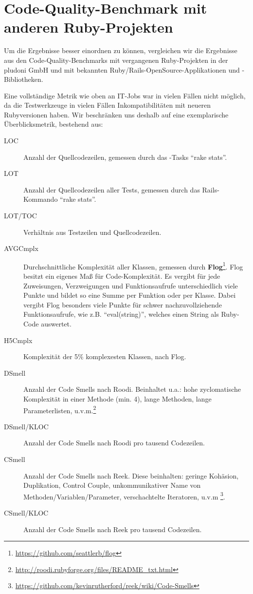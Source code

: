 
\section{Code-Quality-Benchmark mit anderen Ruby-Projekten}

Um die Ergebnisse besser einordnen zu können, vergleichen wir die Ergebnisse aus den Code-Quality-Benchmarks mit vergangenen Ruby-Projekten in der pludoni GmbH und mit bekannten Ruby/Rails-OpenSource-Applikationen und -Bibliotheken.

Eine vollständige Metrik wie oben an IT-Jobs war in vielen Fällen nicht möglich, da die Testwerkzeuge in vielen Fällen Inkompatibilitäten mit neueren Rubyversionen haben. Wir beschränken uns deshalb auf eine exemplarische Überblicksmetrik, bestehend aus:

\begin{description}
 \item[LOC] Anzahl der Quellcodezeilen, gemessen durch das -Tasks "`rake stats"'.
 \item[LOT] Anzahl der Quellcodezeilen aller Tests, gemessen durch das Rails-Kommando "`rake stats"'.
 \item[LOT/TOC] Verhältnis aus Testzeilen und Quellcodezeilen.
 \item[AVGCmplx] Durchschnittliche Komplexität aller Klassen, gemessen durch \textbf{Flog}\footnote{\url{https://github.com/seattlerb/flog}}. Flog besitzt ein eigenes Maß für Code-Komplexität. Es vergibt für jede Zuweisungen, Verzweigungen und Funktionsaufrufe unterschiedlich viele Punkte und bildet so eine Summe per Funktion oder per Klasse. Dabei vergibt Flog besonders viele Punkte für schwer nachzuvollziehende Funktionsaufrufe, wie z.B. "`eval(string)"', welches einen String als Ruby-Code auswertet.
 \item[H5Cmplx] Komplexität der 5\% komplexesten Klassen, nach Flog.
 \item[DSmell] Anzahl der Code Smells nach Roodi. Beinhaltet u.a.: hohe zyclomatische Komplexität in einer Methode (min. 4), lange Methoden, lange Parameterlisten, u.v.m.\footnote{\url{http://roodi.rubyforge.org/files/README_txt.html}}
 \item[DSmell/KLOC] Anzahl der Code Smells nach Roodi pro tausend Codezeilen.
 \item[CSmell] Anzahl der Code Smells nach Reek. Diese beinhalten: geringe Kohäsion, Duplikation, Control Couple, unkommunikativer Name von Methoden/Variablen/Parameter, verschachtelte Iteratoren, u.v.m  \footnote{\url{https://github.com/kevinrutherford/reek/wiki/Code-Smells}}.
 \item[CSmell/KLOC] Anzahl der Code Smells nach Reek pro tausend Codezeilen.
\end{description}







